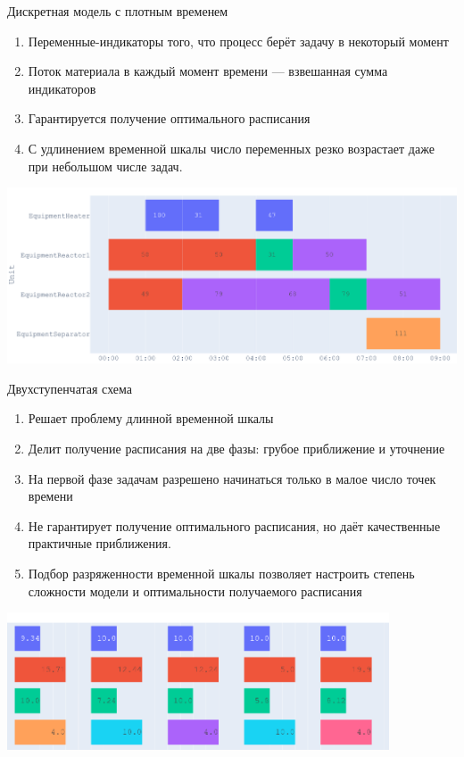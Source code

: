\documentclass{beamer}
\begin{document}
\begin{frame}{Дискретная модель с плотным временем}
	\begin{enumerate}
	\item Переменные-индикаторы того, что процесс берёт задачу в некоторый момент
	\item Поток материала в каждый момент времени --- взвешанная сумма индикаторов
	\item Гарантируется получение оптимального расписания
	\item С удлинением временной шкалы число переменных резко возрастает даже при небольшом числе задач.
\end{enumerate}

\begin{center}
\includegraphics[width=1.0\textwidth]{plan}
\end{center}

\end{frame}

\begin{frame}{Двухступенчатая схема}
	\begin{enumerate}
	\item Решает проблему длинной временной шкалы
	\item Делит получение расписания на две фазы: грубое приближение и уточнение
	\item На первой фазе задачам разрешено начинаться только в малое число точек времени
	\item Не гарантирует получение оптимального расписания, но даёт качественные практичные приближения.
	\item Подбор разряженности временной шкалы позволяет настроить степень сложности модели и оптимальности получаемого расписания
\end{enumerate}

\begin{center}
\includegraphics[width=0.85\textwidth]{plan sparsed}
\end{center}

\end{frame}
\end{document}
